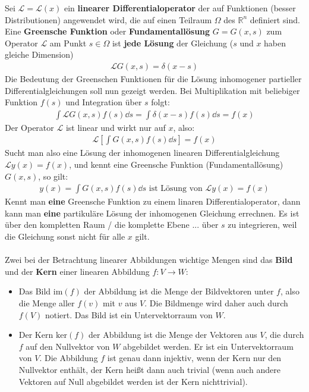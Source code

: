 	 Sei $\mathcal{L}=\mathcal{L}(x)$ ein \textbf{linearer Differentialoperator} der auf Funktionen (besser Distributionen) angewendet wird, die auf einen Teilraum $\Omega$ des $\mathbb{R}^n$ definiert sind.
	  Eine \textbf{Greensche Funktion} oder \textbf{Fundamentallösung} $G=G(x,s)$ zum Operator $\mathcal{L}$ am Punkt $s\in \Omega$ ist \textbf{jede Lösung} der Gleichung ($s$ und $x$ haben gleiche Dimension)
	\begin{equation}\begin{split}
			\mathcal{L}G(x,s) = \delta(x-s)
	\end{split}\end{equation}
	 Die Bedeutung der Greenschen Funktionen für die Lösung inhomogener partieller Differentialgleichungen soll nun gezeigt werden.
	 Bei Multiplikation mit beliebiger Funktion $f(s)$ und Integration über $s$ folgt:
	\begin{equation}\begin{split}
			\int \mathcal{L}G(x,s)f(s) \dd s = \int \delta(x-s) f(s) \dd s = f(x)
	\end{split}\end{equation}
	 Der Operator $\mathcal{L}$ ist linear und wirkt nur auf $x$, also:
	\begin{equation}\begin{split}
			\mathcal{L}\left[ \int G(x,s)f(s) \dd s  \right] = f(x)
	\end{split}\end{equation}
	 Sucht man also eine Lösung der inhomogenen linearen Differentialgleichung $\mathcal{L} y(x) = f(x)$, und kennt eine Greensche Funktion (Fundamentallösung) $G(x,s)$, so gilt:
	\begin{equation}\begin{split}
			\boxed{y(x) = \int G(x,s)f(s)\dd s \text{ ist Lösung von } \mathcal{L} y(x) = f(x)}
	\end{split}\end{equation}
	Kennt man \textbf{eine} Greensche Funktion zu einem linaren Differentialoperator, dann kann man \textbf{eine} partikuläre Lösung der inhomogenen Gleichung errechnen. Es ist über den kompletten Raum / die komplette Ebene ... über $s$ zu integrieren, weil die Gleichung sonst nicht für alle $x$ gilt.\\\\
	Zwei bei der Betrachtung linearer Abbildungen wichtige Mengen sind das \textbf{Bild} und der \textbf{Kern} einer linearen Abbildung $f\colon  V \to W$:
	\begin{itemize}
		\item Das Bild $\mathrm {im} (f)$ der Abbildung ist die Menge der Bildvektoren unter $f$, also die Menge aller $f(v)$ mit $v$ aus $V$. Die Bildmenge wird daher auch durch $f(V)$ notiert. Das Bild ist ein Untervektorraum von $W$.
		\item Der Kern $\mathrm{ker}(f)$ der Abbildung ist die Menge der Vektoren aus $V$, die durch $f$ auf den Nullvektor von $W$ abgebildet werden. Er ist ein Untervektorraum von $V$. Die Abbildung $f$ ist genau dann injektiv, wenn der Kern nur den Nullvektor enthält, der Kern heißt dann auch trivial (wenn auch andere Vektoren auf Null abgebildet werden ist der Kern nichttrivial).
	\end{itemize}
